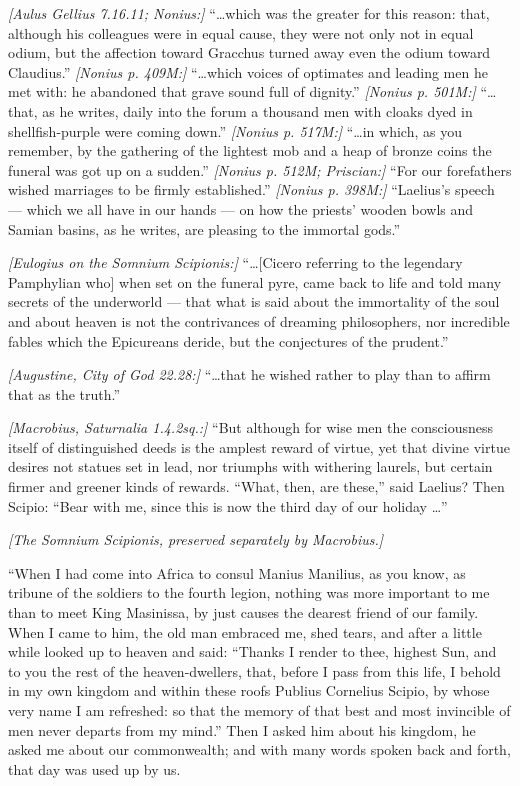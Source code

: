  \textit{[Aulus Gellius 7.16.11; Nonius:]} ``\ldots which was the greater for this reason: that, although his colleagues were in equal cause, they were not only not in equal odium, but the affection toward Gracchus turned away even the odium toward Claudius.'' \textit{[Nonius p. 409M:]} ``\ldots which voices of optimates and leading men he met with: he abandoned that grave sound full of dignity.'' \textit{[Nonius p. 501M:]} ``\ldots that, as he writes, daily into the forum a thousand men with cloaks dyed in shellfish-purple were coming down.'' \textit{[Nonius p. 517M:]} ``\ldots in which, as you remember, by the gathering of the lightest mob and a heap of bronze coins the funeral was got up on a sudden.'' \textit{[Nonius p. 512M; Priscian:]} ``For our forefathers wished marriages to be firmly established.'' \textit{[Nonius p. 398M:]} ``Laelius's speech --- which we all have in our hands --- on how the priests' wooden bowls and Samian basins, as he writes, are pleasing to the immortal gods.''

 \textit{[Eulogius on the Somnium Scipionis:]} ``\ldots [Cicero referring to the legendary Pamphylian who] when set on the funeral pyre, came back to life and told many secrets of the underworld --- that what is said about the immortality of the soul and about heaven is not the contrivances of dreaming philosophers, nor incredible fables which the Epicureans deride, but the conjectures of the prudent.''

 \textit{[Augustine, City of God 22.28:]} ``\ldots that he wished rather to play than to affirm that as the truth.''

 \textit{[Macrobius, Saturnalia 1.4.2sq.:]} ``But although for wise men the consciousness itself of distinguished deeds is the amplest reward of virtue, yet that divine virtue desires not statues set in lead, nor triumphs with withering laurels, but certain firmer and greener kinds of rewards. ``What, then, are these,'' said Laelius? Then Scipio: ``Bear with me, since this is now the third day of our holiday \ldots''

\bigskip
\noindent\textit{[The Somnium Scipionis, preserved separately by Macrobius.]}

 ``When I had come into Africa to consul Manius Manilius, as you know, as tribune of the soldiers to the fourth legion, nothing was more important to me than to meet King Masinissa, by just causes the dearest friend of our family. When I came to him, the old man embraced me, shed tears, and after a little while looked up to heaven and said: ``Thanks I render to thee, highest Sun, and to you the rest of the heaven-dwellers, that, before I pass from this life, I behold in my own kingdom and within these roofs Publius Cornelius Scipio, by whose very name I am refreshed: so that the memory of that best and most invincible of men never departs from my mind.'' Then I asked him about his kingdom, he asked me about our commonwealth; and with many words spoken back and forth, that day was used up by us.

